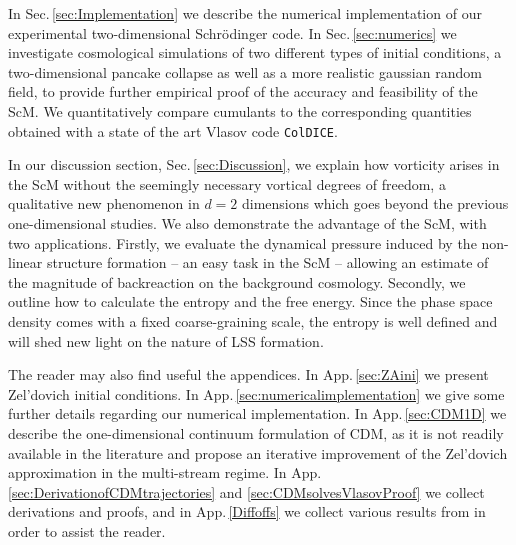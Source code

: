 \documentclass[twocolumn, nofootinbib, showpacs, superscriptaddress]{revtex4-1}
\begin{document}
In Sec.\,\ref{sec:Implementation} we describe the numerical implementation of our experimental two-dimensional Schr\"odinger code.
 In Sec.\,\ref{sec:numerics} we investigate cosmological simulations of two different types of initial conditions, 
 a two-dimensional pancake collapse as well as a more realistic gaussian random field, to provide further empirical 
proof of the accuracy and feasibility of the ScM.  We quantitatively compare cumulants to the corresponding quantities obtained with a 
state of the art Vlasov code \texttt{ColDICE}. 

In our discussion section, Sec.\,\ref{sec:Discussion}, we explain how vorticity arises 
in the ScM without the seemingly necessary vortical degrees of freedom, 
 a qualitative new phenomenon in $d=2$ dimensions which goes beyond the previous one-dimensional studies.
 We also demonstrate the advantage of the ScM, with two applications.
 Firstly, we evaluate the dynamical pressure induced by the non-linear structure formation -- an easy task in the ScM -- allowing
an estimate of the magnitude of backreaction on the background cosmology.
Secondly, we outline how to calculate the entropy and the free energy.
 Since the phase space density comes with a fixed coarse-graining scale, the entropy is well defined and will shed new light on the nature of LSS formation.
 
The reader may also find useful the appendices. In App.\,\ref{sec:ZAini} we present Zel'dovich initial conditions. 
In App.\,\ref{sec:numericalimplementation} we give some further details regarding our numerical implementation.
In App.\,\ref{sec:CDM1D} we describe the one-dimensional continuum formulation of CDM, as it is not readily available 
in the literature and propose an iterative improvement of the Zel'dovich approximation in the multi-stream regime.
In App.\,\ref{sec:DerivationofCDMtrajectories} and \ref{sec:CDMsolvesVlasovProof} we collect derivations and proofs, and in
 App.\,\ref{Diffoffs} we collect various results from \cite{UhlemannKoppHaugg2014} in order to assist the reader.
\end{document}
